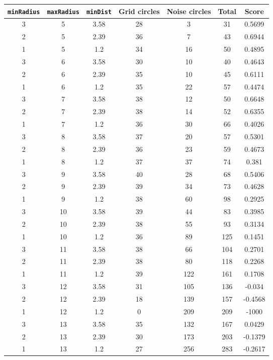 \documentclass[letterpaper, 12pt]{article}
\begin{document}
\begin{longtable}{|c|c|c|c|c|c|c|}
\hline
\textbf{\texttt{minRadius}} & \textbf{\texttt{maxRadius}} & \textbf{\texttt{minDist}} & \textbf{Grid circles} & \textbf{Noise circles} & \textbf{Total} & \textbf{Score} \\
\hline
3 & 5 & 3.58 & 28 & 3 & 31 & 0.5699 \\
\hline
2 & 5 & 2.39 & 36 & 7 & 43 & 0.6944 \\
\hline
1 & 5 & 1.2 & 34 & 16 & 50 & 0.4895 \\
\hline
3 & 6 & 3.58 & 30 & 10 & 40 & 0.4643 \\
\hline
2 & 6 & 2.39 & 35 & 10 & 45 & 0.6111 \\
\hline
1 & 6 & 1.2 & 35 & 22 & 57 & 0.4474 \\
\hline
3 & 7 & 3.58 & 38 & 12 & 50 & 0.6648 \\
\hline
2 & 7 & 2.39 & 38 & 14 & 52 & 0.6355 \\
\hline
1 & 7 & 1.2 & 36 & 30 & 66 & 0.4026 \\
\hline
3 & 8 & 3.58 & 37 & 20 & 57 & 0.5301 \\
\hline
2 & 8 & 2.39 & 36 & 23 & 59 & 0.4673 \\
\hline
1 & 8 & 1.2 & 37 & 37 & 74 & 0.381 \\
\hline
3 & 9 & 3.58 & 40 & 28 & 68 & 0.5406 \\
\hline
2 & 9 & 2.39 & 39 & 34 & 73 & 0.4628 \\
\hline
1 & 9 & 1.2 & 38 & 60 & 98 & 0.2925 \\
\hline
3 & 10 & 3.58 & 39 & 44 & 83 & 0.3985 \\
\hline
2 & 10 & 2.39 & 38 & 55 & 93 & 0.3134 \\
\hline
1 & 10 & 1.2 & 36 & 89 & 125 & 0.1451 \\
\hline
3 & 11 & 3.58 & 38 & 66 & 104 & 0.2701 \\
\hline
2 & 11 & 2.39 & 38 & 80 & 118 & 0.2268 \\
\hline
1 & 11 & 1.2 & 39 & 122 & 161 & 0.1708 \\
\hline
3 & 12 & 3.58 & 31 & 105 & 136 & -0.034 \\
\hline
2 & 12 & 2.39 & 18 & 139 & 157 & -0.4568 \\
\hline
1 & 12 & 1.2 & 0 & 209 & 209 & -1000 \\
\hline
3 & 13 & 3.58 & 35 & 132 & 167 & 0.0429 \\
\hline
2 & 13 & 2.39 & 30 & 173 & 203 & -0.1379 \\
\hline
1 & 13 & 1.2 & 27 & 256 & 283 & -0.2617 \\

\end{longtable}
\end{document}
